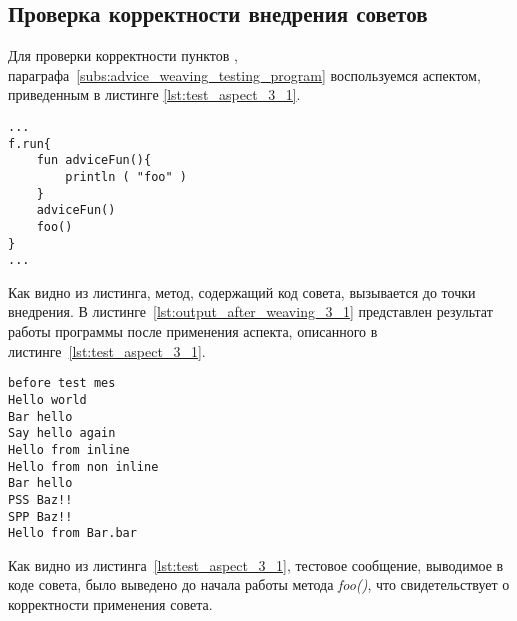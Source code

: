 \subsection{Проверка корректности внедрения советов}
\label{sub:advice_code_weaving_tests}
Для проверки корректности пунктов \quotes{\ref{list:before_advice_weaving_check}},
\quotes{\ref{list:program_work_check}} параграфа~\ref{subs:advice_weaving_testing_program} воспользуемся аспектом, приведенным в листинге \ref{lst:test_aspect_3_1}.
\begin{lstlisting}[style={java}, label={lst:result_of_weaving_3_1},
 caption={Результат применения аспекта, описанного в листинге~\ref{lst:test_aspect_3_1}, к тестовой программе}]
...
f.run{
	fun adviceFun(){
		println ( "foo" )
	}
	adviceFun()
	foo()
}
...
\end{lstlisting}
Как видно из листинга, метод, содержащий код совета, вызывается до точки внедрения.
В листинге~\ref{lst:output_after_weaving_3_1} представлен результат работы программы после применения аспекта, описанного в листинге~\ref{lst:test_aspect_3_1}. 
\begin{lstlisting}[style={java}, label={lst:output_after_weaving_3_1},
 caption={Результат работы программы после применения аспекта, описанного в листинге~\ref{lst:test_aspect_3_1}}]
before test mes
Hello world
Bar hello
Say hello again
Hello from inline
Hello from non inline
Bar hello
PSS Baz!!
SPP Baz!!
Hello from Bar.bar
\end{lstlisting}
Как видно из листинга~\ref{lst:test_aspect_3_1}, тестовое сообщение, выводимое в коде совета, было выведено до начала работы метода \textit{foo()}, что свидетельствует о корректности применения совета.


